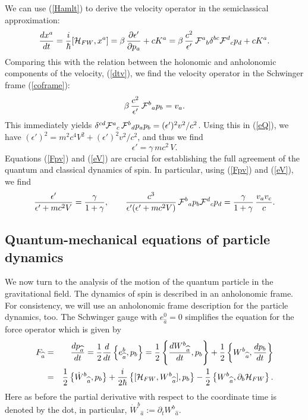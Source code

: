 \documentclass[preprint,showpacs,preprintnumbers,eqsecnum,amsmath,amssymb]{revtex4-1}
\begin{document}
We can use (\ref{Hamlt}) to derive the velocity operator in the semiclassical
approximation:
\begin{equation}
{\frac {dx^a}{dt}} = \frac{i}{\hbar}[{\cal H}_{FW},x^a] = \beta\,{\frac
{\partial\epsilon'}{\partial p_a}} + cK^a
= \beta\,{\frac {c^2}{\epsilon'}}\,{\cal F}^a{}_b\delta^{bc}{\cal F}^d{}_c
p_d + cK^a.\label{velocity}
\end{equation}
Comparing this with the relation between the holonomic and anholonomic
components of the velocity, (\ref{dtv}),
we find the velocity operator in the Schwinger frame (\ref{coframe}):
\begin{equation}
\beta\,{\frac {c^2}{\epsilon'}}\,{\cal F}^b{}_ap_b = v_a.\label{Fpv}
\end{equation}
This immediately yields $\delta^{cd}{\cal F}^a{}_c\,{\cal F}^b{}_d p_ap_b =
(\epsilon')^2v^2/c^2$. Using this in (\ref{eQ}), we have $(\epsilon')^2 =
m^2c^4V^2 + (\epsilon')^2v^2/c^2$, and thus we find
\begin{equation}
\epsilon' = \gamma\,mc^2\,V.\label{eV}
\end{equation}
Equations (\ref{Fpv}) and (\ref{eV}) are crucial for establishing the full
agreement of the quantum and classical dynamics of spin. In particular, using
(\ref{Fpv}) and (\ref{eV}), we find
\begin{equation}
{\frac {\epsilon'}{\epsilon' + mc^2V}} = {\frac \gamma {1 +
\gamma}},\qquad {\frac {c^3}{\epsilon'(\epsilon'+mc^2V)}}\,{\cal
F}^b{}_ap_b{\cal F}^d{}_cp_d = {\frac \gamma {1 + \gamma}}\,{\frac
{v_av_c}{c}}.\label{factors}
\end{equation}


\subsection{Quantum-mechanical equations of particle dynamics} \label{forces}


We now turn to the analysis of the motion of the quantum particle in the
gravitational field. The dynamics of spin is described in an anholonomic frame.
For consistency, we will use an anholonomic frame description for the particle
dynamics, too. The Schwinger gauge with $e^0_{\widehat a} = 0$ simplifies the
equation for the force operator which is given by
\begin{eqnarray}
F_{\widehat a} &=& {\frac {dp_{\widehat a}}{dt}} = {\frac 12} {\frac d{dt}}
\left\{e^b_{\widehat a},p_b\right\} =  {\frac 12}\left\{{\frac
{dW^b{}_{\widehat a}}{dt}},p_b\right\} + {\frac 12}\left\{W^b{}_{\widehat a},
{\frac {dp_b}{dt}}\right\} \nonumber\\
&=& {\frac 12} \left\{\dot{W}^b{}_{\widehat a},p_b\right\} +  {\frac i{2\hbar}}
\left\{[{\cal H}_{FW},W^b{}_{\widehat a}],p_b\right\} - {\frac 12}\left\{
W^b{}_{\widehat a},\partial_b{\cal H}_{FW}\right\}.\label{forcefactoan}
\end{eqnarray}
Here as before the partial derivative with respect to the coordinate time is denoted
by the dot, in particular, $\dot{W}^b{}_{\widehat a} := \partial_t{W}^b{}_{\widehat a}$.
\end{document}
